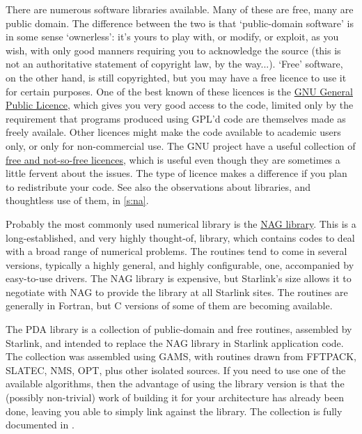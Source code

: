 \documentclass[11pt,oneside,chapters]{starlink}
\begin{document}

There are numerous software libraries available.  Many of
these are free, many are public domain.  The difference
between the two is that `public-domain software' is in some
sense `ownerless': it's yours to play with, or modify, or
exploit, as you wish, with only good manners requiring you
to acknowledge the source (this is not an authoritative
statement of copyright law, by the way...).  `Free'
software, on the other hand, is still copyrighted, but you
may have a free licence to use it for certain purposes.  One
of the best known of these licences is the
\href{http://www.gnu.org/copyleft/gpl.html}{GNU General Public Licence},
which gives you very good access to
the code, limited only by the requirement that programs
produced using GPL'd code are themselves made as freely
availale.  Other licences might make the code available to
academic users only, or only for non-commercial use.  The
GNU project have a useful collection of
\href{http://www.gnu.org/licenses/license-list.html}{free and not-so-free licences},
which is useful even though
they are sometimes a little fervent about the issues.  The
type of licence makes a difference if you plan to
redistribute your code.  See also the observations about
libraries, and thoughtless use of them, in \ref{s:na}.

Probably the most commonly used numerical library is the
\href{http://www.nag.co.uk}{NAG library}.
This is a long-established, and very highly thought-of,
library, which contains codes to deal with a broad range of
numerical problems.  The routines tend to come in several
versions, typically a highly general, and highly
configurable, one, accompanied by easy-to-use drivers.  The
NAG library is expensive, but Starlink's size allows it to
negotiate with NAG to provide the library at all Starlink
sites.  The routines are generally in Fortran, but C
versions of some of them are becoming available.

The PDA library is a collection of public-domain and free routines,
assembled by Starlink, and intended to replace the NAG library in
Starlink application code.  The collection was assembled using GAMS,
with routines drawn from FFTPACK, SLATEC,
NMS, OPT, plus other isolated sources.  If you need
to use one of the available algorithms, then the
advantage of using the library version is that the (possibly
non-trivial) work of building it for your architecture has already
been done, leaving you able to simply link against the library.  The
collection is fully documented in
.
\end{document}
